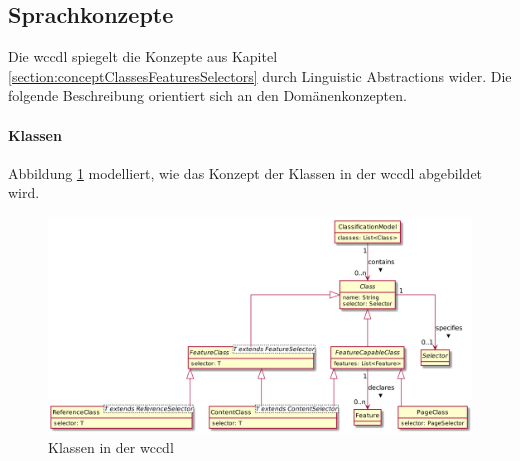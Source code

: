 \subsection{Sprachkonzepte}
    \label{solutionDetails:dslConcepts}
    Die \gls{wccdl} spiegelt die Konzepte aus
    Kapitel \ref{section:conceptClassesFeaturesSelectors}
    durch Linguistic Abstractions wider.
    Die folgende Beschreibung orientiert sich an den
    Domänenkonzepten.
    
    \paragraph*{Klassen}
    Abbildung \ref{image:dslClasses} modelliert,
    wie das Konzept der Klassen in der \gls{wccdl} abgebildet wird.

    \begin{figure}[htb]
        \centering
        \includegraphics[scale=\imageScalingFactor]{../resources/dsl/classes.png}
        \caption{Klassen in der \acrshort{wccdl}}
        \label{image:dslClasses}
    \end{figure}


